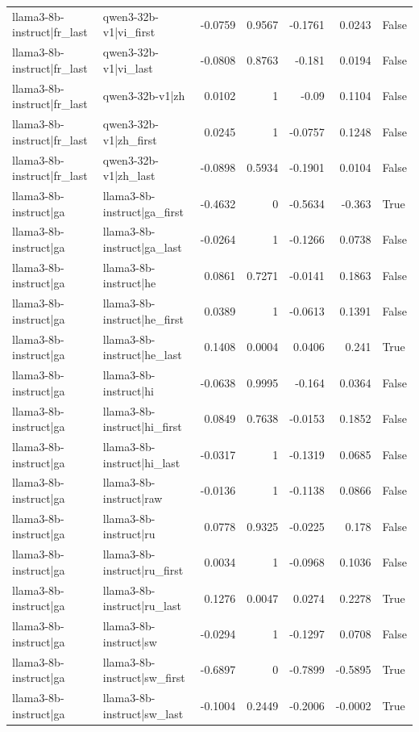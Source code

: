 \begin{table}
\begin{tabular}{l l r r r r l}
llama3-8b-instruct|fr_last & qwen3-32b-v1|vi_first & -0.0759 & 0.9567 & -0.1761 & 0.0243 & False \\
llama3-8b-instruct|fr_last & qwen3-32b-v1|vi_last & -0.0808 & 0.8763 & -0.181 & 0.0194 & False \\
llama3-8b-instruct|fr_last & qwen3-32b-v1|zh & 0.0102 & 1 & -0.09 & 0.1104 & False \\
llama3-8b-instruct|fr_last & qwen3-32b-v1|zh_first & 0.0245 & 1 & -0.0757 & 0.1248 & False \\
llama3-8b-instruct|fr_last & qwen3-32b-v1|zh_last & -0.0898 & 0.5934 & -0.1901 & 0.0104 & False \\
llama3-8b-instruct|ga & llama3-8b-instruct|ga_first & -0.4632 & 0 & -0.5634 & -0.363 & True \\
llama3-8b-instruct|ga & llama3-8b-instruct|ga_last & -0.0264 & 1 & -0.1266 & 0.0738 & False \\
llama3-8b-instruct|ga & llama3-8b-instruct|he & 0.0861 & 0.7271 & -0.0141 & 0.1863 & False \\
llama3-8b-instruct|ga & llama3-8b-instruct|he_first & 0.0389 & 1 & -0.0613 & 0.1391 & False \\
llama3-8b-instruct|ga & llama3-8b-instruct|he_last & 0.1408 & 0.0004 & 0.0406 & 0.241 & True \\
llama3-8b-instruct|ga & llama3-8b-instruct|hi & -0.0638 & 0.9995 & -0.164 & 0.0364 & False \\
llama3-8b-instruct|ga & llama3-8b-instruct|hi_first & 0.0849 & 0.7638 & -0.0153 & 0.1852 & False \\
llama3-8b-instruct|ga & llama3-8b-instruct|hi_last & -0.0317 & 1 & -0.1319 & 0.0685 & False \\
llama3-8b-instruct|ga & llama3-8b-instruct|raw & -0.0136 & 1 & -0.1138 & 0.0866 & False \\
llama3-8b-instruct|ga & llama3-8b-instruct|ru & 0.0778 & 0.9325 & -0.0225 & 0.178 & False \\
llama3-8b-instruct|ga & llama3-8b-instruct|ru_first & 0.0034 & 1 & -0.0968 & 0.1036 & False \\
llama3-8b-instruct|ga & llama3-8b-instruct|ru_last & 0.1276 & 0.0047 & 0.0274 & 0.2278 & True \\
llama3-8b-instruct|ga & llama3-8b-instruct|sw & -0.0294 & 1 & -0.1297 & 0.0708 & False \\
llama3-8b-instruct|ga & llama3-8b-instruct|sw_first & -0.6897 & 0 & -0.7899 & -0.5895 & True \\
llama3-8b-instruct|ga & llama3-8b-instruct|sw_last & -0.1004 & 0.2449 & -0.2006 & -0.0002 & True \\

\end{tabular}
\end{table}

